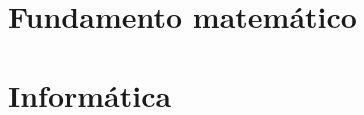 \documentclass[print, color]{ugrTFG}
\begin{document}
\maketitle

\frontmatter %

   
            

                    
               

\mainmatter %

\part{Fundamento matemático} %



%


\cleardoublepage\part{Informática}






\appendix %
\end{document}

